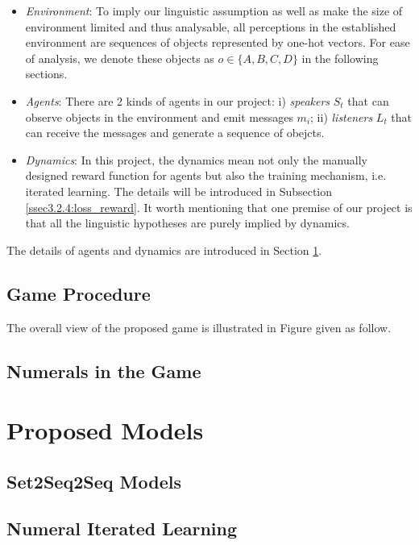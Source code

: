 \documentclass[msc,deptreport]{infthesis} %
\begin{document}
\begin{itemize}
  \item \textit{Environment}: To imply our linguistic assumption as well as make the size of environment limited and thus analysable, all perceptions in the established environment are sequences of objects represented by one-hot vectors. For ease of analysis, we denote these objects as $o \in \{ A, B, C, D\}$ in the following sections.
  \item \textit{Agents}: There are 2 kinds of agents in our project: i) \textit{speakers} $S_t$ that can observe objects in the environment and emit messages $m_i$; ii) \textit{listeners} $L_t$ that can receive the messages and generate a sequence of obejcts.
  \item \textit{Dynamics}: In this project, the dynamics mean not only the manually designed reward function for agents but also the training mechanism, i.e. iterated learning. The details will be introduced in Subsection \ref{ssec3.2.4:loss_reward}. It worth mentioning that one premise of our project is that all the linguistic hypotheses are purely implied by dynamics.
\end{itemize}

The details of agents and dynamics are introduced in Section \ref{sec3.2:models}.

\subsection{Game Procedure}
\label{ssec3.1.1:game_procedure}

The overall view of the proposed game is illustrated in Figure given as follow.

\subsection{Numerals in the Game}
\label{ssec3.1.2:numeral_in_game}

\section{Proposed Models}
\label{sec3.2:models}

\subsection{Set2Seq2Seq Models}
\label{ssec3.2.1:set2seq2seq}

\subsection{Numeral Iterated Learning}
\label{ssec3.2.2:3phase}
\end{document}

